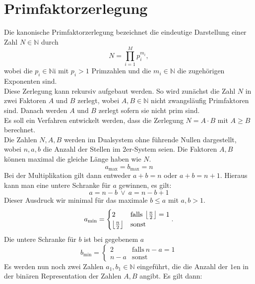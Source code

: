 \section{Primfaktorzerlegung}
Die kanonische Primfaktorzerlegung bezeichnet die eindeutige Darstellung einer Zahl $N\in\mathbb{N}$ durch
\begin{equation*}
  N=\prod\limits_{i=1}^M p_i^{m_i},
\end{equation*}
wobei die $p_i\in\mathbb{N}$i mit $p_i>1$ Primzahlen und die $m_i\in\mathbb{N}$ die zugehörigen Exponenten sind.\\
Diese Zerlegung kann rekursiv aufgebaut werden. So wird zunächst die Zahl $N$ in zwei Faktoren $A$ und $B$ zerlegt, wobei $A,B\in\mathbb{N}$ nicht zwangsläufig Primfaktoren sind. Danach werden $A$ und $B$ zerlegt sofern sie nicht prim sind.\\
Es soll ein Verfahren entwickelt werden, dass die Zerlegung $N=A\cdot B$ mit $A\geq B$ berechnet.\\
Die Zahlen $N,A,B$ werden im Dualsystem ohne führende Nullen dargestellt, wobei $n, a, b$ die Anzahl der Stellen im $2$er-System seien. Die Faktoren $A, B$ können maximal die gleiche Länge haben wie $N$.
\begin{equation*}
		a_\mathrm{max}=b_\mathrm{max}=n
\end{equation*}
Bei der Multiplikation gilt dann entweder $a+b=n$ oder $a+b=n+1$. Hieraus kann man eine untere Schranke für $a$ gewinnen, es gilt:
\begin{equation*}
		a=n-b \:\vee\: a=n-b+1
\end{equation*}
Dieser Ausdruck wir minimal für das maximale $b \leq a$ mit $a,b>1$.
\begin{equation*}
		a_\mathrm{min}=\begin{cases}
						2 & \mathrm{falls}\:\left\lfloor\frac{n}{2}\right\rfloor = 1 \\
						\left\lfloor\frac{n}{2}\right\rfloor & \mathrm{sonst}
				\end{cases}.
\end{equation*}
Die untere Schranke für $b$ ist bei gegebenem $a$
\begin{equation*}
		b_\mathrm{min}=\begin{cases}
						2 & \mathrm{falls}\:n-a=1 \\
						n-a & \mathrm{sonst}
				\end{cases}
\end{equation*}
Es werden nun noch zwei Zahlen $a_1, b_1\in\mathbb{N}$ eingeführt, die die Anzahl der $1$en in der binären Representation der Zahlen $A, B$ angibt. Es gilt dann:
